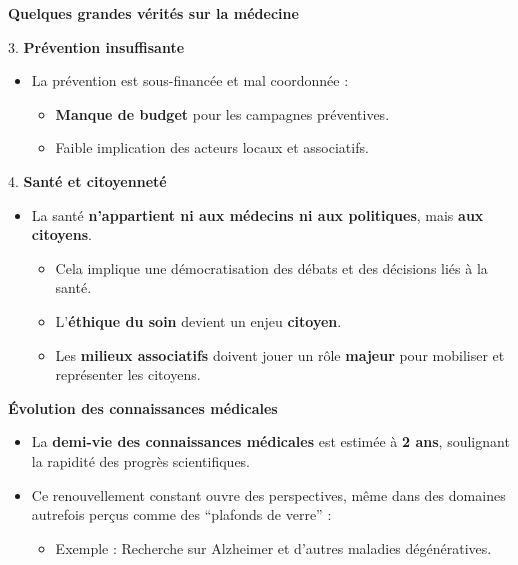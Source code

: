 \documentclass[
  ignorenonframetext,
]{beamer}
\providecommand{\tightlist}{%
  \setlength{\itemsep}{0pt}\setlength{\parskip}{0pt}}\usepackage{longtable,booktabs,array}
\begin{document}
\begin{frame}{\textbf{Quelques grandes vérités sur la médecine}}
\begin{block}{3. \textbf{Prévention insuffisante}}
\protect\hypertarget{pruxe9vention-insuffisante}{}
\begin{itemize}
\tightlist
\item
  La prévention est sous-financée et mal coordonnée :

  \begin{itemize}
  \tightlist
  \item
    \textbf{Manque de budget} pour les campagnes préventives.\\
  \item
    Faible implication des acteurs locaux et associatifs.
  \end{itemize}
\end{itemize}
\end{block}

\begin{block}{4. \textbf{Santé et citoyenneté}}
\protect\hypertarget{santuxe9-et-citoyennetuxe9}{}
\begin{itemize}
\tightlist
\item
  La santé \textbf{n'appartient ni aux médecins ni aux politiques}, mais
  \textbf{aux citoyens}.

  \begin{itemize}
  \tightlist
  \item
    Cela implique une démocratisation des débats et des décisions liés à
    la santé.\\
  \item
    L'\textbf{éthique du soin} devient un enjeu \textbf{citoyen}.\\
  \item
    Les \textbf{milieux associatifs} doivent jouer un rôle
    \textbf{majeur} pour mobiliser et représenter les citoyens.
  \end{itemize}
\end{itemize}
\end{block}
\end{frame}

\begin{frame}{\textbf{Évolution des connaissances médicales}}
\protect\hypertarget{uxe9volution-des-connaissances-muxe9dicales}{}
\begin{itemize}
\tightlist
\item
  La \textbf{demi-vie des connaissances médicales} est estimée à
  \textbf{2 ans}, soulignant la rapidité des progrès scientifiques.\\
\item
  Ce renouvellement constant ouvre des perspectives, même dans des
  domaines autrefois perçus comme des ``plafonds de verre'' :

  \begin{itemize}
  \tightlist
  \item
    Exemple : Recherche sur Alzheimer et d'autres maladies
    dégénératives.
  \end{itemize}
\end{itemize}
\end{frame}
\end{document}
